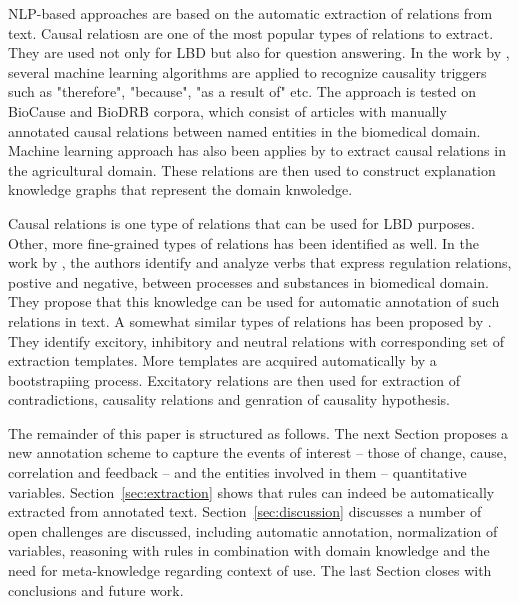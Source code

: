 \documentclass[10pt, a4paper]{article}
\begin{document}
NLP-based approaches are based on the automatic extraction of relations from text. Causal relatiosn are one of the most popular types of relations to extract. They are used not only for LBD but also for question answering. In the work by \cite{Mihaila2013}, several machine learning algorithms are applied to recognize causality triggers such as "therefore", "because", "as a result of" etc. The approach is tested on BioCause and BioDRB corpora, which consist of articles with manually annotated causal relations between named entities in the biomedical domain. Machine learning approach has also been applies by \cite{Pechsiri2010a} to extract causal relations in the agricultural domain. These relations are then used to construct explanation knowledge graphs that represent the domain knwoledge.

Causal relations is one type of relations that can be used for LBD purposes. Other, more fine-grained types of relations has been identified as well. In the work by \cite{Zambach2010Lexical}, the authors identify and analyze verbs that express regulation relations, postive and negative, between processes and substances in biomedical domain. They propose that this knowledge can be used for automatic annotation of such relations in text. A somewhat similar types of relations has been proposed by \cite{Hashimoto2012Excitatory}. They identify excitory, inhibitory and neutral relations with corresponding set of extraction templates. More templates are acquired automatically by a bootstrapiing process. Excitatory relations are then used for extraction of contradictions, causality relations and genration of causality hypothesis.

The remainder of this paper is structured as follows. 
The next Section proposes a new annotation scheme to capture the events of interest -- those of change, cause, correlation and feedback -- and the entities involved in them -- quantitative variables. 
Section~\ref{sec:extraction} shows that  rules can indeed be automatically extracted from annotated text.
Section~\ref{sec:discussion} discusses a number of open challenges are discussed, including automatic annotation, normalization of variables, reasoning with rules in combination with domain knowledge and the need for meta-knowledge regarding context of use.
The last Section closes with conclusions and future work.
\end{document}
